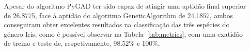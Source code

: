 Apesar do algoritmo PyGAD ter sido capaz de atingir uma aptidão final superior de 26.8775, face à aptidão do algoritmo GeneticAlgorithm de 24.1857, ambos conseguiram obter excelentes resultados na classificação das três espécies do género Iris, como é possível observar na Tabela~\ref{tab:metrics}, com uma exatidão de treino e teste de, respetivamente, 98.52\% e 100\%.